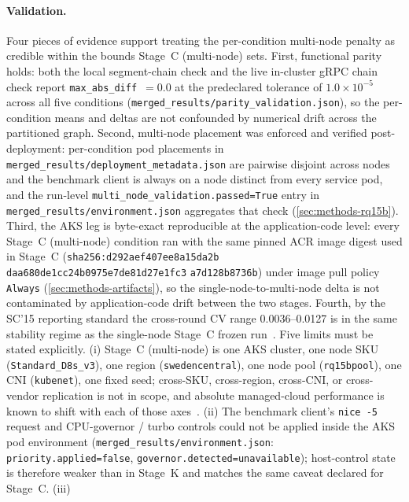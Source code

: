 \paragraph{Validation.}
Four pieces of evidence support treating the per-condition multi-node
penalty as credible within the bounds Stage~C (multi-node) sets. First, functional parity
holds: both the local segment-chain check and the live in-cluster gRPC
chain check report \texttt{max\_abs\_diff}~$=0.0$ at the predeclared
tolerance of $1.0\times10^{-5}$ across all five conditions
(\texttt{merged\_results/parity\_validation.json}), so the per-condition
means and deltas are not confounded by numerical drift across the
partitioned graph. Second, multi-node placement was enforced and verified
post-deployment: per-condition pod placements in
\texttt{merged\_results/deployment\_metadata.json} are pairwise disjoint
across nodes and the benchmark client is always on a node distinct from
every service pod, and the run-level
\texttt{multi\_node\_validation.passed=True} entry in
\texttt{merged\_results/environment.json} aggregates that check
(\cref{sec:methods-rq15b}). Third, the AKS leg is byte-exact reproducible
at the application-code level: every Stage~C (multi-node) condition ran with the same
pinned ACR image digest used in Stage~C
(\texttt{sha256:d292aef407ee8a15da2b}\allowbreak%
\texttt{daa680de1cc24b0975e7de81d27e1fc3}\allowbreak%
\texttt{a7d128b8736b}) under image pull policy \texttt{Always}
(\cref{sec:methods-artifacts}), so the single-node-to-multi-node delta is
not contaminated by application-code drift between the two stages. Fourth,
by the SC'15 reporting standard the cross-round CV range 0.0036--0.0127 is
in the same stability regime as the single-node Stage~C frozen
run~\cite{benchmarking_sc15}. Five limits must be stated explicitly. (i)
Stage~C (multi-node) is one AKS cluster, one node SKU (\texttt{Standard\_D8s\_v3}), one
region (\texttt{swedencentral}), one node pool (\texttt{rq15bpool}), one
CNI (\texttt{kubenet}), one fixed seed; cross-SKU, cross-region, cross-CNI,
or cross-vendor replication is not in scope, and absolute managed-cloud
performance is known to shift with each of those
axes~\cite{managed_k8s_perf,virtualization_costs,cni_k8s_ic2e21}. (ii) The
benchmark client's \texttt{nice~-5} request and CPU-governor / turbo
controls could not be applied inside the AKS pod environment
(\texttt{merged\_results/environment.json}: \texttt{priority.applied=false},
\texttt{governor.detected=unavailable}); host-control state is therefore
weaker than in Stage~K and matches the same caveat declared for Stage~C. (iii)
